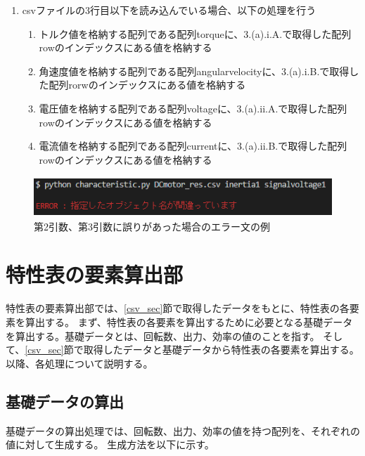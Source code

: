 \begin{enumerate}
        \begin{enumerate}
            \item 
        \end{enumerate}
        \item csvファイルの3行目以下を読み込んでいる場合、以下の処理を行う
        \begin{enumerate}
            \item トルク値を格納する配列である配列torqueに、3.(a).i.A.で取得した配列rowのインデックスにある値を格納する
            \item 角速度値を格納する配列である配列angularvelocityに、3.(a).i.B.で取得した配列rorwのインデックスにある値を格納する
            \item 電圧値を格納する配列である配列voltageに、3.(a).ii.A.で取得した配列rowのインデックスにある値を格納する
            \item 電流値を格納する配列である配列currentに、3.(a).ii.B.で取得した配列rowのインデックスにある値を格納する
        \end{enumerate}
\end{enumerate}
\begin{figure}[t]
	\centering
	\includegraphics[width=12cm,height=1.5cm]{./Image/error_comand.png}
	\caption{第2引数、第3引数に誤りがあった場合のエラー文の例}
	\label{fig:error_comand}
\end{figure}
\section{特性表の要素算出部}\label{youso_sec}
特性表の要素算出部では、\ref{csv_sec}節で取得したデータをもとに、特性表の各要素を算出する。
まず、特性表の各要素を算出するために必要となる基礎データを算出する。基礎データとは、回転数、出力、効率の値のことを指す。
そして、\ref{csv_sec}節で取得したデータと基礎データから特性表の各要素を算出する。
以降、各処理について説明する。
\subsection{基礎データの算出}\label{sub:youso_kiso}
基礎データの算出処理では、回転数、出力、効率の値を持つ配列を、それぞれの値に対して生成する。
生成方法を以下に示す。

